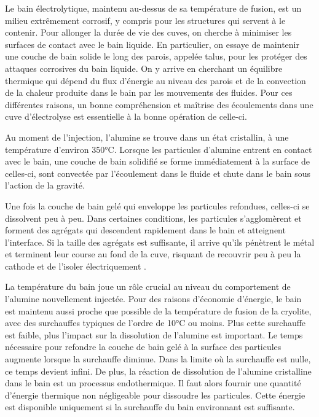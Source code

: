 Le bain électrolytique, maintenu au-dessus de sa température de
fusion, est un milieu extrêmement corrosif, y compris pour les
structures qui servent à le contenir. Pour allonger la durée de vie
des cuves, on cherche à minimiser les surfaces de contact avec le bain
liquide. En particulier, on essaye de maintenir une couche de bain
solide le long des parois, appelée talus, pour les protéger des
attaques corrosives du bain liquide. On y arrive en cherchant un
équilibre thermique qui dépend du flux d'énergie au niveau des parois
et de la convection de la chaleur produite dans le bain par les
mouvements des fluides. Pour ces différentes raisons, un bonne
compréhension et maîtrise des écoulements dans une cuve d'électrolyse
est essentielle à la bonne opération de celle-ci.

Au moment de l'injection, l'alumine se trouve dans un état cristallin,
à une température d'environ \num{350}\si{\celsius}. Lorsque les
particules d'alumine entrent en contact avec le bain, une couche de
bain solidifié se forme immédiatement à la surface de celles-ci,
sont convectée par l'écoulement dans le fluide et chute dans le bain
sous l'action de la gravité.

Une fois la couche de bain gelé qui enveloppe les particules
refondues, celles-ci se dissolvent peu à peu. Dans certaines
conditions, les particules s'agglomèrent et forment des agrégats
qui descendent rapidement dans le bain et atteignent l'interface. Si
la taille des agrégats est suffisante, il arrive qu'ils pénètrent
le métal et terminent leur course au fond de la cuve, risquant de
recouvrir peu à peu la cathode et de l'isoler électriquement \cite{Geay2016}.

La température du bain joue un rôle crucial au niveau du comportement
de l'alumine nouvellement injectée. Pour des raisons d'économie
d'énergie, le bain est maintenu aussi proche que possible de la
température de fusion de la cryolite, avec des surchauffes typiques de
l'ordre de \num{10}\si{\celsius} ou moins. Plus cette surchauffe est
faible, plus l'impact sur la dissolution de l'alumine est
important. Le temps nécessaire pour refondre la couche de bain gelé à
la surface des particules augmente lorsque la surchauffe diminue. Dans
la limite où la surchauffe est nulle, ce temps devient infini. De
plus, la réaction de dissolution de l'alumine cristalline dans le bain
est un processus endothermique. Il faut alors fournir une quantité
d'énergie thermique non négligeable pour dissoudre les
particules. Cette énergie est disponible uniquement si la surchauffe
du bain environnant est suffisante.

